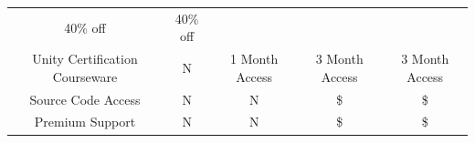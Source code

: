 \documentclass[12pt]{article}
\begin{document}
\begin{longtable}[]{@{}ccccc@{}}
\begin{minipage}[t]{0.14\columnwidth}
40\% off\strut
\end{minipage} & \begin{minipage}[t]{0.23\columnwidth}\centering\strut
40\% off\strut
\end{minipage}\tabularnewline
\begin{minipage}[t]{0.18\columnwidth}\centering\strut
Unity Certification Courseware\strut
\end{minipage} & \begin{minipage}[t]{0.18\columnwidth}\centering\strut
N\strut
\end{minipage} & \begin{minipage}[t]{0.14\columnwidth}\centering\strut
1 Month Access\strut
\end{minipage} & \begin{minipage}[t]{0.14\columnwidth}\centering\strut
3 Month Access\strut
\end{minipage} & \begin{minipage}[t]{0.23\columnwidth}\centering\strut
3 Month Access\strut
\end{minipage}\tabularnewline
\begin{minipage}[t]{0.18\columnwidth}\centering\strut
Source Code Access\strut
\end{minipage} & \begin{minipage}[t]{0.18\columnwidth}\centering\strut
N\strut
\end{minipage} & \begin{minipage}[t]{0.14\columnwidth}\centering\strut
N\strut
\end{minipage} & \begin{minipage}[t]{0.14\columnwidth}\centering\strut
\$\strut
\end{minipage} & \begin{minipage}[t]{0.23\columnwidth}\centering\strut
\$\strut
\end{minipage}\tabularnewline
\begin{minipage}[t]{0.18\columnwidth}\centering\strut
Premium Support\strut
\end{minipage} & \begin{minipage}[t]{0.18\columnwidth}\centering\strut
N\strut
\end{minipage} & \begin{minipage}[t]{0.14\columnwidth}\centering\strut
N\strut
\end{minipage} & \begin{minipage}[t]{0.14\columnwidth}\centering\strut
\$\strut
\end{minipage} & \begin{minipage}[t]{0.23\columnwidth}\centering\strut
\$\strut
\end{minipage}\tabularnewline
\bottomrule
\end{longtable}
\end{document}
